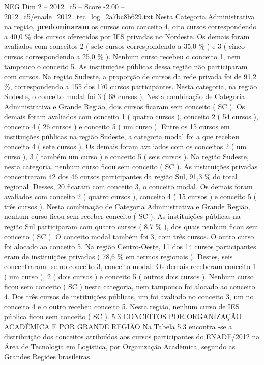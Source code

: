 \begin{textsample}{NEG Dim 2 – 2012\_c5 – Score -2.00 – 2012\_c5/enade\_2012\_tec\_log\_2a7bc8b629.txt}
Nesta Categoria Administrativa na região, \textbf{predominaram} os cursos com conceito 4, oito cursos correspondendo a 40,0 \% dos cursos oferecidos por IES privadas no Nordeste.
Os demais foram avaliados com conceitos 2 ( sete cursos correspondendo a 35,0 \% ) e 3 ( cinco cursos correspondendo a 25,0 \% ).
Nenhum curso recebeu o conceito 1, nem tampouco o conceito 5.
As instituições públicas dessa região não participaram com cursos.
Na região Sudeste, a proporção de cursos da rede privada foi de 91,2 \%, correspondendo a 155 dos 170 cursos participantes.
Nesta categoria, na região Sudeste, o conceito modal foi 3 ( 68 cursos ).
Nesta combinação de Categoria Administrativa e Grande Região, dois cursos ficaram sem conceito ( SC ).
Os demais foram avaliados com conceito 1 ( quatro cursos ), conceito 2 ( 54 cursos ), conceito 4 ( 26 cursos ) e conceito 5 ( um curso ).
Entre os 15 cursos em instituições públicas na região Sudeste, a categoria modal foi a que recebeu conceito 4 ( sete cursos ).
Os demais foram avaliados com os conceitos 2 ( um curso ), 3 ( também um curso ) e conceito 5 ( seis cursos ).
Na região Sudeste, nesta categoria, nenhum curso ficou sem conceito ( SC ).
As instituições privadas concentraram 42 dos 46 cursos participantes da região Sul, 91,3 \% do total regional.
Desses, 20 ficaram com conceito 3, o conceito modal.
Os demais foram avaliados com conceito 2 ( quatro cursos ), conceito 4 ( 15 cursos ) e conceito 5 ( três cursos ).
Nesta combinação de Categoria Administrativa e Grande Região, nenhum curso ficou sem receber conceito ( SC ).
As instituições públicas na região Sul participaram com quatro cursos ( 8,7 \% ), dos quais nenhum ficou sem conceito ( SC ).
O conceito modal também foi 3, com três cursos.
O outro curso foi alocado ao conceito 5.
Na região Centro-Oeste, 11 dos 14 cursos participantes eram de instituições privadas ( 78,6 \% em termos regionais ).
Destes, seis concentraram -se no conceito 3, conceito modal.
Os demais receberam conceito 1 ( um curso ), 2 ( dois cursos ) e conceito 5 ( outros dois cursos ).
Nenhum curso ficou sem conceito ( SC ) nesta categoria, nem tampouco foi alocado ao conceito 4.
Dos três cursos de instituições públicas, um foi avaliado no conceito 3, um no conceito 4 e o outro recebeu conceito 5.
Nesta região, nenhum curso de IES pública ficou sem conceito ( SC ). 5.3 CONCEITOS POR ORGANIZAÇÃO ACADÊMICA E POR GRANDE REGIÃO Na Tabela 5.3 encontra -se a distribuição dos conceitos atribuídos aos cursos participantes do ENADE/2012 na Área de Tecnologia em Logística, por Organização Acadêmica, segundo as Grandes Regiões brasileiras.

\end{textsample}
